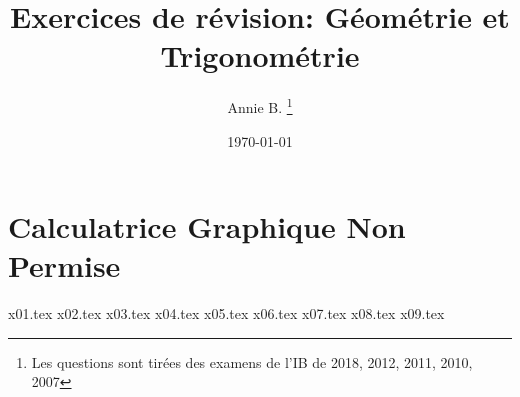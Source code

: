 \documentclass[10pt]{article}
\newcounter{question}
\begin{document}

\title{Exercices de révision: Géométrie et Trigonométrie}
\author{Annie B. \thanks{Les questions sont tirées des examens de l’IB de 2018, 2012, 2011, 2010, 2007}}
\date{\today}
\maketitle

\newpage
\section*{\textbf{Calculatrice Graphique Non Permise}}
{x01.tex}
\bigskip
{x02.tex}
\bigskip
{x03.tex}
\bigskip
{x04.tex}
\bigskip
{x05.tex}
\bigskip
{x06.tex}
\bigskip
{x07.tex}
\bigskip
{x08.tex}
\bigskip
{x09.tex}
\end{document}
